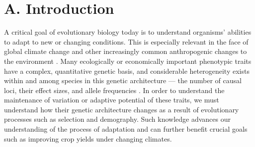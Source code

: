 




\vspace{-0.5cm}

\section*{A. Introduction}	%

A critical goal of evolutionary biology today is to understand organisms' abilities to adapt to new or changing conditions. This is especially relevant in the face of global climate change and other increasingly common anthropogenic changes to the environment \citep{Easterling:2000ja}. Many ecologically or economically important phenotypic traits have a complex, quantitative genetic basis, and considerable heterogeneity exists within and among species in this genetic architecture --- the number of causal loci, their effect sizes, and allele frequencies \citep{orr:2001, slate:2005}. In order to understand the maintenance of variation or adaptive potential of these traits, we must understand how their genetic architecture changes as a result of evolutionary processes such as selection and demography. Such knowledge advances our understanding of the process of adaptation and can further benefit crucial goals such as improving crop yields under changing climates. 

